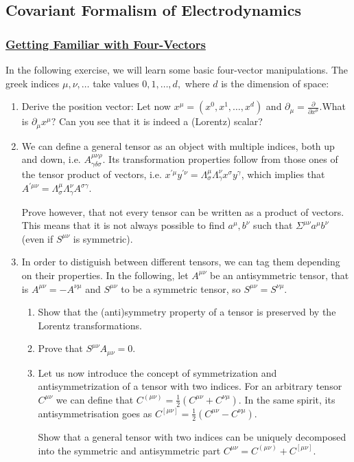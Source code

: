 
\subsection{Covariant Formalism of Electrodynamics}

\subsubsection{\hyperref[Getting Familiar with Four-Vectors]{Getting Familiar with Four-Vectors}}

In the following exercise, we will learn some basic four-vector manipulations. The greek indices $\mu, \nu, \ldots$ take values $0,1, \ldots, d,$ where $d$ is the dimension of space:

\begin{enumerate}
	\item Derive the position vector: Let now $x^{\mu}=\left(x^{0}, x^{1}, \ldots, x^{d}\right)$ and $\partial_{\mu}=\frac{\partial}{\partial x^{\mu}}$.What is $\partial_{\mu} x^{\mu} ?$ Can you see that it is indeed a (Lorentz) scalar?
	\item We can define a general tensor as an object with multiple indices, both up and down, i.e. $A_{\gamma \delta \sigma}^{\mu \nu \rho} .$ Its transformation properties follow from those ones of the tensor product of vectors, i.e. $x^{\prime \mu} y^{\prime \nu}=\Lambda_{\sigma}^{\mu} \Lambda_{\gamma}^{\nu} x^{\sigma} y^{\gamma}$, which implies that $A^{\prime \mu \nu}=\Lambda_{\sigma}^{\mu} \Lambda_{\gamma}^{\nu} A^{\sigma \gamma}$.
	
	Prove however, that not every tensor can be written as a product of vectors. This means that it is not always possible to find $a^{\mu}, b^{\nu}$ such that $\Sigma^{\mu \nu} a^{\mu} b^{\nu}$ (even if $S^{\mu \nu}$ is symmetric).
	\item In order to distiguish between different tensors, we can tag them depending on their properties. In the following, let $A^{\mu \nu}$ be an antisymmetric tensor, that is $A^{\mu \nu}=-A^{\nu \mu}$ and $S^{\mu \nu}$ to be a symmetric tensor, so $S^{\mu \nu}=S^{\nu \mu}$.
	
	\begin{enumerate}
		\item Show that the (anti)symmetry property of a tensor is preserved by the Lorentz transformations.
		\item Prove that $S^{\mu \nu} A_{\mu \nu}=0$.
		\item Let us now introduce the concept of symmetrization and antisymmetrization of a tensor with two indices. For an arbitrary tensor $C^{\mu \nu}$ we can define that $C^{(\mu \nu)}=\frac{1}{2}\left(C^{\mu \nu}+C^{\nu \mu}\right)$. In the same spirit, its antisymmetrisation goes as $C^{[\mu \nu]}=\frac{1}{2}\left(C^{\mu \nu}-C^{\nu \mu}\right)$.
		
		Show that a general tensor with two indices can be uniquely decomposed into the symmetric and antisymmetric part $C^{\mu \nu}=C^{(\mu \nu)}+C^{[\mu \nu]}$.
	\end{enumerate}
\end{enumerate}

